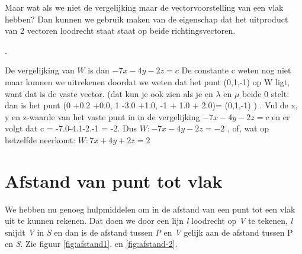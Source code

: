 
Maar wat als we niet de vergelijking maar de vectorvoorstelling van een vlak hebben? Dan kunnen we gebruik maken van de eigenschap dat  het uitproduct van 2 vectoren loodrecht staat staat op beide richtingsvectoren. 

.


De vergelijking van $ W $ is dan  $ -7x-4y-2z = c $ De constante c weten nog niet maar kunnen we uitrekenen doordat we weten dat het punt (0,1,-1) op W ligt, want dat is de vaste vector. (dat kun je ook zien als je en $ \lambda $  en $ \mu $  beide 0 stelt: dan is het punt (0 +0.2 +0.0, 1 -3.0 +1.0, -1 + 1.0 + 2.0)= (0,1,-1)  ) .
Vul de x, y en z-waarde van het vaste punt  in in de vergelijking $ -7x-4y-2z = c $ en er volgt dat c = -7.0-4.1-2.-1 = -2. Dus $ W: -7x-4y-2z = -2 $ , of, wat op hetzelfde neerkomt:  $ W: 7x+4y+2z = 2 $

\section{Afstand van punt tot vlak}
We hebben nu genoeg hulpmiddelen om in \RD de afstand van een punt tot een vlak uit te kunnen rekenen. Dat doen we   door een lijn \textit{l} loodrecht op \textit{V} te tekenen,\textit{ l }snijdt \textit{V} in\textit{ S} en dan is de afstand tussen \textit{P} en \textit{V} gelijk aan de afstand tussen P\textit{} en \textit{S}. Zie figuur   \ref{fig:afstand1}. en \ref{fig:afstand-2}.

